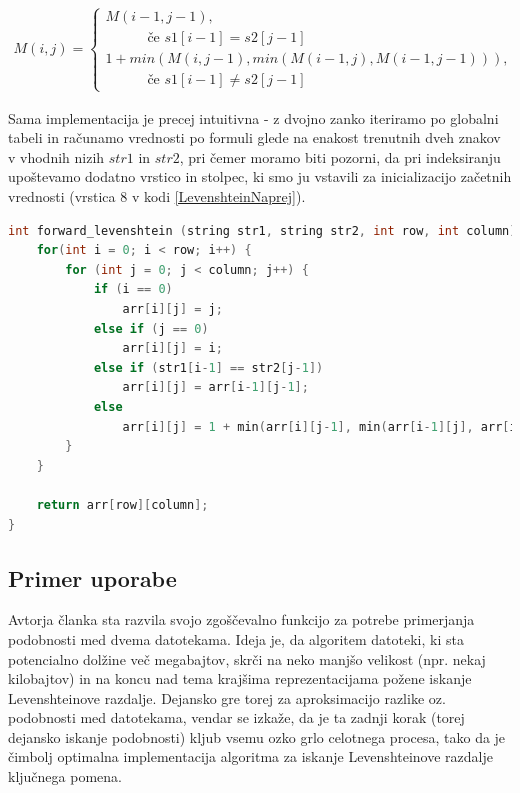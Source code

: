 \documentclass[a4paper,12pt,openright]{book}
\begin{document}
\bigskip \bigskip

\begin{equation}
\label{LevenshteinEquation}
\begin{aligned}
M(i, j) =
\begin{cases}
     M(i-1, j-1) ,     \\ \quad \quad \quad \text{če } s1[i-1]=s2[j-1]\\
     1 + min(M(i, j-1), min(M(i-1, j), M(i-1, j-1))) , \\ \quad \quad \quad \text{če } s1[i-1] \neq s2[j-1]
  \end{cases}
\end{aligned}
\end{equation}

\bigskip \bigskip

Sama implementacija je precej intuitivna - z dvojno zanko iteriramo po globalni tabeli in računamo vrednosti po formuli glede na enakost trenutnih dveh znakov v vhodnih nizih $str1$ in $str2$, pri čemer moramo biti pozorni, da pri indeksiranju upoštevamo dodatno vrstico in stolpec, ki smo ju vstavili za inicializacijo začetnih vrednosti (vrstica 8 v kodi \ref{LevenshteinNaprej}). \bigskip \bigskip

\begin{lstlisting}[language=C++, caption={Algoritem za izračun Levenshteinove razdalje}, captionpos=b, label=LevenshteinNaprej]
int forward_levenshtein (string str1, string str2, int row, int column) {
    for(int i = 0; i < row; i++) {
        for (int j = 0; j < column; j++) {    
            if (i == 0)
                arr[i][j] = j;
            else if (j == 0)
                arr[i][j] = i;
            else if (str1[i-1] == str2[j-1])
                arr[i][j] = arr[i-1][j-1];
            else 
                arr[i][j] = 1 + min(arr[i][j-1], min(arr[i-1][j], arr[i-1][j-1]));
        }
    }

    return arr[row][column];
}
\end{lstlisting}

\subsection{Primer uporabe}

Avtorja članka \cite{documentsimilarity} sta razvila svojo zgoščevalno funkcijo za potrebe primerjanja podobnosti med dvema datotekama. Ideja je, da algoritem datoteki, ki sta potencialno dolžine več megabajtov, skrči na neko manjšo velikost (npr. nekaj kilobajtov) in na koncu nad tema krajšima reprezentacijama požene iskanje Levenshteinove razdalje. Dejansko gre torej za aproksimacijo razlike oz. podobnosti med datotekama, vendar se izkaže, da je ta zadnji korak (torej dejansko iskanje podobnosti) kljub vsemu ozko grlo celotnega procesa, tako da je čimbolj optimalna implementacija algoritma za iskanje Levenshteinove razdalje ključnega pomena. 
\end{document}
